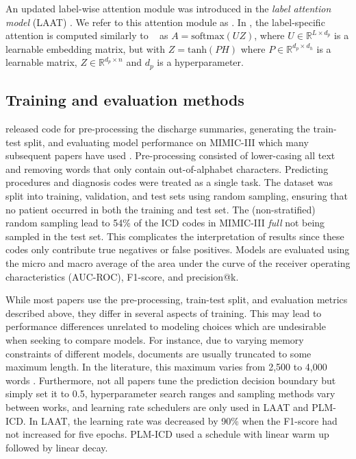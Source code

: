 {An updated label-wise attention module was introduced in the \textit{label attention model} (LAAT) \parencite{vuLabelAttentionModel2020}. We refer to this attention module as \lalaat. In \lalaat, the label-specific attention is computed similarly to  \lacaml~ as $A = \text{softmax}(UZ)$, where $U \in \mathbb{R}^{L \times d_p}$ is a learnable embedding matrix, but with 
$Z = \text{tanh}(PH)$ 
where $P \in \mathbb{R}^{d_p \times d_h}$ is a learnable matrix, $Z \in \mathbb{R}^{d_p \times n}$ and $d_p$ is a hyperparameter.


\subsection{Training and evaluation methods}\label{sec: training and evaluation methods}

\textcite{mullenbachExplainablePredictionMedical2018} released code for pre-processing the discharge summaries, generating the train-test split, and evaluating model performance on MIMIC-III which many subsequent papers have used \parencite{vuLabelAttentionModel2020, huangPLMICDAutomaticICD2022, liICDCodingClinical2020, baoMedicalCodePrediction2021, yuanCodeSynonymsMatter2022, kimReadAttendCode2021}.
Pre-processing consisted of lower-casing all text and removing words that only contain out-of-alphabet characters. Predicting procedures and diagnosis codes were treated as a single task.
The dataset was split into training, validation, and test sets using random sampling, ensuring that no patient occurred in both the training and test set. The (non-stratified) random sampling lead to 54\% of the ICD codes in MIMIC-III \textit{full} not being sampled in the test set. This complicates the interpretation of results since these codes only contribute true negatives or false positives. 
Models are evaluated using the micro and macro average of the area under the curve of the receiver operating characteristics (AUC-ROC), F1-score, and precision@k. 

While most papers use the pre-processing, train-test split, and evaluation metrics described above, they differ in several aspects of training. This may lead to performance differences unrelated to modeling choices which are undesirable when seeking to compare models. 
For instance, due to varying memory constraints of different models, documents are usually truncated to some maximum length. In the literature, this maximum varies from 2,500 to 4,000 words \parencite{mullenbachExplainablePredictionMedical2018, vuLabelAttentionModel2020, huangPLMICDAutomaticICD2022}.
Furthermore, not all papers tune the prediction decision boundary but simply set it to 0.5,
 hyperparameter search ranges and sampling methods  vary between works, and learning rate schedulers are only used in LAAT and PLM-ICD\parencite{mullenbachExplainablePredictionMedical2018, liICDCodingClinical2020}. In LAAT, the learning rate was decreased by 90\% when the F1-score had not increased for five epochs. PLM-ICD used a schedule with linear warm up followed by linear decay. 

}
